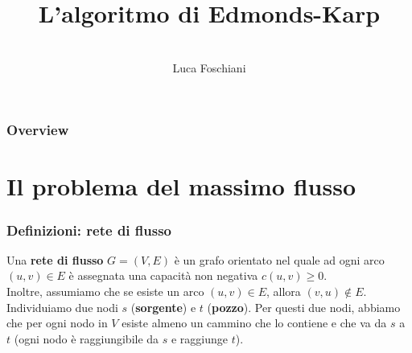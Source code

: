 \documentclass{beamer}
\title[L'algoritmo di Edmonds-Karp]{L'algoritmo di Edmonds-Karp } %
\author{\\Luca Foschiani} %
\institute[] %
{
Università degli studi di Udine \\ %
\medskip
Advanced Algorithms
}
\date{} %
\begin{document}
\begin{frame}
\titlepage %
\end{frame}

\begin{frame}
\frametitle{Overview} %
\tableofcontents %
\end{frame}


\section{Il problema del massimo flusso} %


\begin{frame}
\frametitle{Definizioni: rete di flusso}
Una \textbf{rete di flusso} $G=(V,E)$ è un grafo orientato nel quale ad ogni arco $(u,v)\in E$ è assegnata una capacità non negativa $c(u,v)\geq 0$.\\
Inoltre, assumiamo che se esiste un arco $(u,v)\in E$, allora $(v,u)\notin E$.\\
Individuiamo due nodi $s$ (\textbf{sorgente}) e $t$ (\textbf{pozzo}). Per questi due nodi, abbiamo che per ogni nodo in $V$ esiste almeno un cammino che lo contiene e che va da $s$ a $t$ (ogni nodo è raggiungibile da $s$ e raggiunge $t$).
\end{frame}
\end{document}
